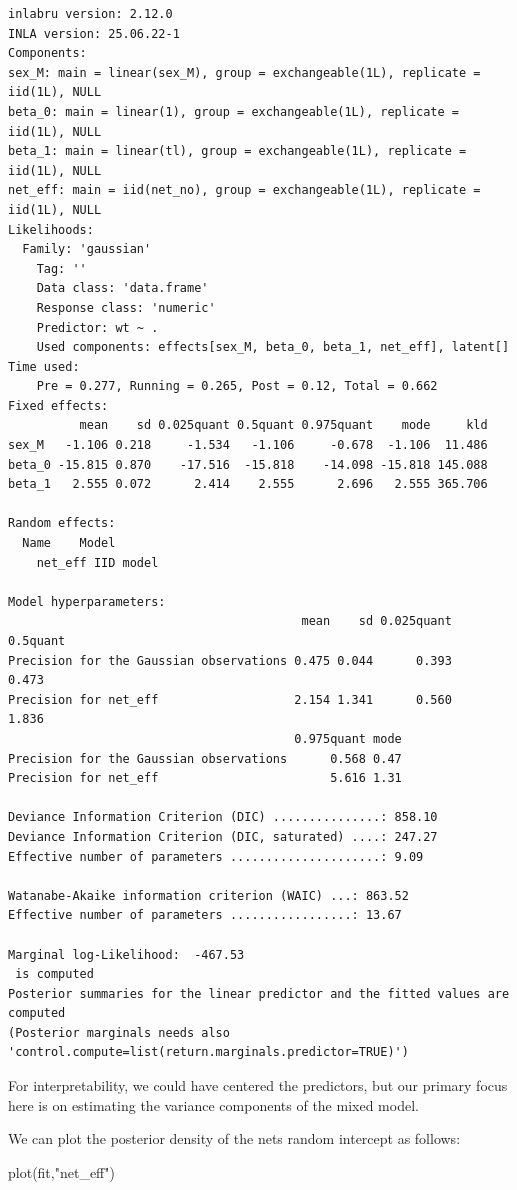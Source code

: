 \documentclass[
  letterpaper,
  DIV=11,
  numbers=noendperiod]{scrartcl}
\newenvironment{Shaded}{\begin{snugshade}}{\end{snugshade}}
\newcommand{\FunctionTok}[1]{\textcolor[rgb]{0.28,0.35,0.67}{#1}}
\newcommand{\NormalTok}[1]{\textcolor[rgb]{0.00,0.23,0.31}{#1}}
\newcommand{\StringTok}[1]{\textcolor[rgb]{0.13,0.47,0.30}{#1}}
\begin{document}
\begin{verbatim}
inlabru version: 2.12.0
INLA version: 25.06.22-1
Components:
sex_M: main = linear(sex_M), group = exchangeable(1L), replicate = iid(1L), NULL
beta_0: main = linear(1), group = exchangeable(1L), replicate = iid(1L), NULL
beta_1: main = linear(tl), group = exchangeable(1L), replicate = iid(1L), NULL
net_eff: main = iid(net_no), group = exchangeable(1L), replicate = iid(1L), NULL
Likelihoods:
  Family: 'gaussian'
    Tag: ''
    Data class: 'data.frame'
    Response class: 'numeric'
    Predictor: wt ~ .
    Used components: effects[sex_M, beta_0, beta_1, net_eff], latent[]
Time used:
    Pre = 0.277, Running = 0.265, Post = 0.12, Total = 0.662 
Fixed effects:
          mean    sd 0.025quant 0.5quant 0.975quant    mode     kld
sex_M   -1.106 0.218     -1.534   -1.106     -0.678  -1.106  11.486
beta_0 -15.815 0.870    -17.516  -15.818    -14.098 -15.818 145.088
beta_1   2.555 0.072      2.414    2.555      2.696   2.555 365.706

Random effects:
  Name    Model
    net_eff IID model

Model hyperparameters:
                                         mean    sd 0.025quant 0.5quant
Precision for the Gaussian observations 0.475 0.044      0.393    0.473
Precision for net_eff                   2.154 1.341      0.560    1.836
                                        0.975quant mode
Precision for the Gaussian observations      0.568 0.47
Precision for net_eff                        5.616 1.31

Deviance Information Criterion (DIC) ...............: 858.10
Deviance Information Criterion (DIC, saturated) ....: 247.27
Effective number of parameters .....................: 9.09

Watanabe-Akaike information criterion (WAIC) ...: 863.52
Effective number of parameters .................: 13.67

Marginal log-Likelihood:  -467.53 
 is computed 
Posterior summaries for the linear predictor and the fitted values are computed
(Posterior marginals needs also 'control.compute=list(return.marginals.predictor=TRUE)')
\end{verbatim}

For interpretability, we could have centered the predictors, but our
primary focus here is on estimating the variance components of the mixed
model.

We can plot the posterior density of the nets random intercept as
follows:

\begin{Shaded}
\begin{Highlighting}[]
\FunctionTok{plot}\NormalTok{(fit,}\StringTok{"net\_eff"}\NormalTok{)}
\end{Highlighting}
\end{Shaded}
\end{document}
